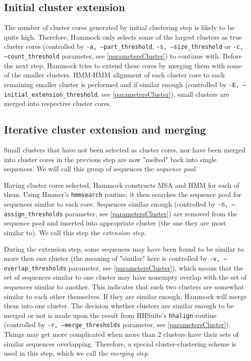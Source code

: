 \documentclass[11pt, a4paper, twoside, titlepage]{article}
\begin{document}
\subsection{Initial cluster extension}
The number of cluster cores generated by initial clustering step is likely to be quite high. Therefore, Hammock only selects some of the largest clusters as true cluster cores (controlled by \texttt{-a, --part\_threshold}, \texttt{-s, --size\_threshold} or \texttt{-c, --count\_threshold} parameter, see \ref{parametersCluster}) to continue with. Before the next step, Hammock tries to extend these cores by merging them with some of the smaller clusters. HMM-HMM alignment of each cluster core to each remaining smaller cluster is performed and if similar enough (controlled by \texttt{-E, --initial\_extension\_threshold}, see \ref{parametersCluster}), small clusters are merged into respective cluster cores. 


\subsection{Iterative cluster extension and merging}

Small clusters that have not been selected as cluster cores, nor have been merged into cluster cores in the previous step are now "melted" back into single sequences. We will call this group of sequences the \emph{sequence pool}.

Having cluster cores selected, Hammock constructs MSA and HMM for each of them. Using Hmmer's \texttt{hmmsearch} routine, it then searches the sequence pool for sequences similar to each core. Sequences similar enough (controlled by \texttt{-n, --assign\_thresholds} parameter, see \ref{parametersCluster}) are removed from the sequence pool and inserted into appropriate cluster (the one they are most similar to). We call this step the \emph{extension step}.

During the extension step, some sequences may have been found to be similar to more then one cluster (the meaning of "similar" here is controlled by \texttt{-v, --overlap\_thresholds} parameter, see \ref{parametersCluster}), which means that the set of sequences similar to one cluster may have nonempty overlap with the set of sequences similar to another. This indicates that such two clusters are somewhat similar to each other themselves. If they are similar enough, Hammock will merge them into one cluster. The decision whether clusters are similar enough to be merged or not is made upon the result from HHSuite's \texttt{hhalign} routine (controlled by \texttt{-r, --merge\_thresholds} parameter, see \ref{parametersCluster}). Things may get more complicated when more than 2 clusters have their sets of similar sequences overlapping. Therefore, a special cluster-clustering scheme is used in this step, which we call the \emph{merging step}. \newline
\end{document}
